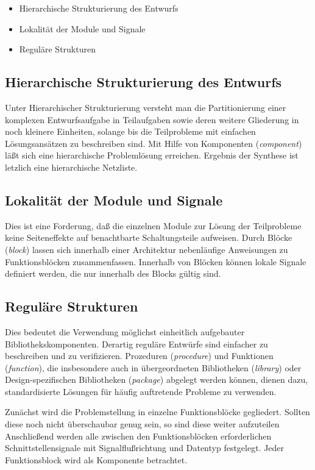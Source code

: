 \documentclass{article}
\begin{document}
\begin{itemize}
  \item Hierarchische Strukturierung des Entwurfs
  \item Lokalität der Module und Signale
  \item Reguläre Strukturen
\end{itemize}

\subsection{Hierarchische Strukturierung des Entwurfs}
Unter Hierarchischer Strukturierung versteht man die Partitionierung einer komplexen Entwurfsaufgabe
in Teilaufgaben sowie deren weitere Gliederung in noch kleinere Einheiten, solange bis die 
Teilprobleme mit einfachen Lösungsansätzen zu beschreiben sind. Mit Hilfe von Komponenten 
(\emph{component}) läßt sich eine hierarchische Problemlösung erreichen. Ergebnis der Synthese ist
letzlich eine hierarchische Netzliste.

\subsection{Lokalität der Module und Signale}
Dies ist eine Forderung, daß die einzelnen Module zur Lösung der Teilprobleme keine Seiteneffekte
auf benachtbarte Schaltungsteile aufweisen. Durch Blöcke (\emph{block}) lassen sich innerhalb einer
Architektur nebenläufige Anweisungen zu Funktionsblöcken zusammenfassen. Innerhalb von Blöcken 
können lokale Signale definiert werden, die nur innerhalb des Blocks gültig sind.

\subsection{Reguläre Strukturen}
Dies bedeutet die Verwendung möglichst einheitlich aufgebauter Bibliothekskomponenten. Derartig
reguläre Entwürfe sind einfacher zu beschreiben und zu verifizieren. Prozeduren (\emph{procedure})
und Funktionen (\emph{function}), die insbesondere auch in übergeordneten Bibliotheken 
(\emph{library}) oder Design-spezifischen Bibliotheken (\emph{package}) abgelegt werden können,
dienen dazu, standardisierte Lösungen für häufig auftretende Probleme zu verwenden.

\vspace{10mm}
Zunächst wird die Problemstellung in einzelne Funktionsblöcke gegliedert. Sollten diese noch nicht 
überschaubar genug sein, so sind diese weiter aufzuteilen Anschließend werden alle zwischen den
Funktionsblöcken erforderlichen Schnittstellensignale mit Signalflußrichtung und Datentyp 
festgelegt. Jeder Funktionsblock wird als Komponente betrachtet.
\end{document}
